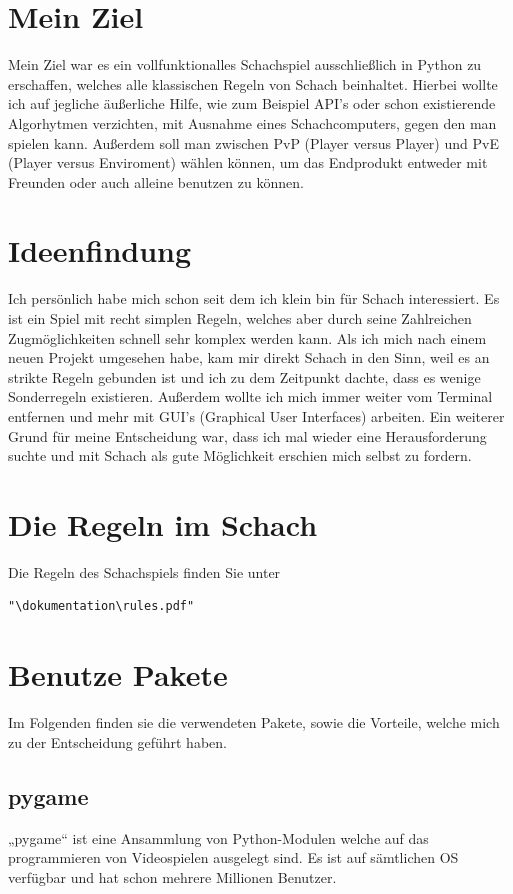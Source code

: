 \documentclass[a4paper, 10pt]{scrartcl}
\begin{document}
\section{Mein Ziel}
Mein Ziel war es ein vollfunktionalles Schachspiel ausschließlich in Python
zu erschaffen, welches alle klassischen Regeln von Schach beinhaltet. 
Hierbei wollte ich auf jegliche äußerliche Hilfe, wie zum Beispiel API's oder schon
existierende Algorhytmen verzichten, mit Ausnahme eines Schachcomputers, gegen den man spielen kann. 
Außerdem soll man zwischen PvP (Player versus Player) und PvE (Player versus Enviroment) wählen können,
um das Endprodukt entweder mit Freunden oder auch alleine benutzen zu können.

\section{Ideenfindung}
Ich persönlich habe mich schon seit dem ich klein bin für Schach interessiert.
Es ist ein Spiel mit recht simplen Regeln, welches aber durch seine Zahlreichen Zugmöglichkeiten schnell sehr komplex werden kann.
Als ich mich nach einem neuen Projekt umgesehen habe, kam mir direkt Schach in den Sinn, weil es an strikte Regeln gebunden ist und
ich zu dem Zeitpunkt dachte, dass es wenige Sonderregeln existieren.
Außerdem wollte ich mich immer weiter vom Terminal entfernen und mehr mit
GUI's (Graphical User Interfaces) arbeiten. Ein weiterer Grund für meine Entscheidung war, dass ich mal wieder eine Herausforderung suchte
und mit Schach als gute Möglichkeit erschien mich selbst zu fordern. 

\section{Die Regeln im Schach}
Die Regeln des Schachspiels finden Sie unter \begin{verbatim}"\dokumentation\rules.pdf" \end{verbatim}

\section{Benutze Pakete}
Im Folgenden finden sie die verwendeten Pakete, sowie die Vorteile, welche mich zu der Entscheidung geführt haben.

\subsection{pygame}
„pygame“ ist eine Ansammlung von Python-Modulen welche auf das programmieren von Videospielen ausgelegt sind. Es ist auf sämtlichen OS verfügbar und hat schon mehrere Millionen Benutzer.
\end{document}
